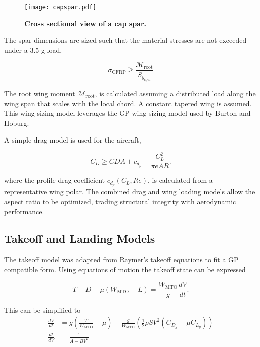 \documentclass[]{aiaa-tc}%
\begin{document}
\begin{figure}[h!]
	\begin{center}
	\texttt{[image: capspar.pdf]}
    \caption{\textbf{Cross sectional view of a cap spar.}}
	\label{f:capspar}
	\end{center}
\end{figure}

The spar dimensions are sized such that the material stresses are not exceeded under a 3.5 g-load,

\begin{equation}
    \sigma_{\mathrm{CFRP}} \geq \frac{\mathcal{M}_{\mathrm{root}}}{S_{y_{\mathrm{spar}}}}
\end{equation}

The root wing moment $\mathcal{M}_{\mathrm{root}}$, is calculated assuming a distributed load along the wing span that scales with the local chord.\cite{bending}
A constant tapered wing is assumed.  
This wing sizing model leverages the GP wing sizing model used by Burton and Hoburg.\cite{burton_solar_2017} 

A simple drag model is used for the aircraft, 

\begin{equation}
    C_D \geq CDA + c_{d_p} + \frac{C_L^2}{\pi e AR}.
\end{equation}

where the profile drag coefficient $c_{d_p}(C_L, Re)$, is calculated from a representative wing polar. 
The combined drag and wing loading models allow the aspect ratio to be optimized, trading structural integrity with aerodynamic performance. 

\subsection{Takeoff and Landing Models}

The takeoff model was adapted from Raymer's takeoff equations to fit a GP compatible form.  Using equations of motion the takeoff state can be expressed

\begin{equation}
    T - D - \mu(W_{\mathrm{MTO}} - L) = \frac{W_{\mathrm{MTO}}}{g} \frac{dV}{dt}.
\end{equation}

This can be simplified to 
\begin{align}
    \frac{dV}{dt} &= g \left( \frac{T}{W_{\mathrm{MTO}}} - \mu \right) - \frac{g}{W_{\mathrm{MTO}}} \left( \frac{1}{2} \rho S V^2 (C_{D_g} - \mu C_{L_g})\right) \\
    \label{e:todiff}
    \frac{dt}{dV} &= \frac{1}{A-BV^2}
\end{align}
\end{document}

